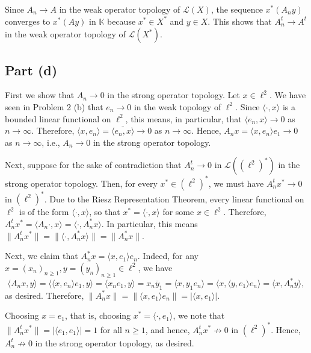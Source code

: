 \documentclass[11pt]{article}
\theoremstyle{thmstyle}
\theoremstyle{defstyle}
\newcommand{\R}{\mathbb{R}}
\newcommand{\bbC}{\mathbb{C}}
\newcommand{\K}{\mathbb{K}} %
\renewcommand{\ge}{\geqslant}
\newcommand{\calL}{\mathcal{L}}
\begin{document}
Since $A_n\to A$ in the weak operator topology of $\calL(X)$, the sequence $x^\ast(A_n y)$ converges to $x^\ast(Ay)$ in $\K$ because $x^\ast\in X^\ast$ and $y\in X$. This shows that $A_n^t\to A^t$ in the weak operator topology of $\calL(X^\ast)$.

\subsection{Part (d)}

First we show that $A_n\to 0$ in the strong operator topology. Let $x\in\ell^2$. We have seen in Problem 2 (b) that $e_n\to 0$ in the weak topology of $\ell^2$. Since $\langle \cdot, x\rangle$ is a bounded linear functional on $\ell^2$, this means, in particular, that $\langle e_n, x\rangle\to 0$ as $n\to\infty$. Therefore, $\langle x, e_n\rangle = \overline{\langle e_n, x\rangle}\to 0$ as $n\to\infty$. Hence, $A_nx = \langle x, e_n\rangle e_1\to 0$ as $n\to\infty$, i.e., $A_n\to 0$ in the strong operator topology.

Next, suppose for the sake of contradiction that $A_n^t\to 0$ in $\calL((\ell^2)^\ast)$ in the strong operator topology. Then, for every $x^\ast\in\left(\ell^2\right)^\ast$, we must have $A_n^t x^\ast\to 0$ in $\left(\ell^2\right)^\ast$. Due to the Riesz Representation Theorem, every linear functional on $\ell^2$ is of the form $\langle\cdot, x\rangle$, so that $x^\ast = \langle\cdot, x\rangle$ for some $x\in \ell^2$. Therefore, $A_n^t x^\ast = \langle A_n\cdot, x\rangle = \langle \cdot, A_n^\ast x\rangle$. In particular, this means $\|A_n^t x^\ast\| = \|\langle\cdot, A_n^\ast x\rangle\| = \|A_n^\ast x\|$.

Next, we claim that $A_n^\ast x = \langle x, e_1\rangle e_n$. Indeed, for any $x = (x_n)_{n\ge 1}, y = (y_n)_{n\ge 1}\in\ell^2$, we have 
\begin{equation*}
    \langle A_n x, y\rangle = \langle \langle x, e_n\rangle e_1, y\rangle = \langle x_n e_1, y\rangle = x_n\overline y_1 = \langle x, y_1 e_n\rangle = \langle x, \langle y, e_1\rangle e_n\rangle = \langle x, A_n^\ast y\rangle,
\end{equation*}
as desired. Therefore, $\|A_n^\ast x\| = \|\langle x, e_1\rangle e_n\| = |\langle x, e_1\rangle|$.

Choosing $x = e_1$, that is, choosing $x^\ast = \langle\cdot, e_1\rangle$, we note that $\|A_n^t x^\ast\| = |\langle e_1, e_1\rangle| = 1$ for all $n\ge1$, and hence, $A_n^t x^\ast\not\to 0$ in $\left(\ell^2\right)^\ast$. Hence, $A_n^t\not\to0$ in the strong operator topology, as desired.
\end{document}
